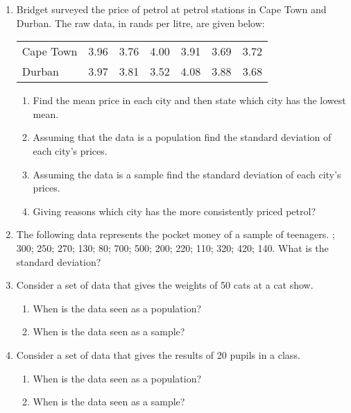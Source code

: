 {
\begin{enumerate}
\item Bridget surveyed the price of petrol at petrol stations in Cape Town and Durban. The raw data, in rands per litre, are given below:
\begin{center}
\begin{tabular}{lllllll}
Cape Town & 3.96 & 3.76 & 4.00 & 3.91 & 3.69 & 3.72 \\
Durban    & 3.97 & 3.81 & 3.52 & 4.08 & 3.88 & 3.68 \\ 
\end{tabular}
\end{center}
	\begin{enumerate}
	\item Find the mean price in each city and then state which city has the lowest mean.
	\item Assuming that the data is a population find the standard deviation of each city's prices.
	\item Assuming the data is a sample find the standard deviation of each city's prices.
	\item Giving reasons which city has the more consistently priced petrol?
	\end{enumerate}
\item The following data represents the pocket money of a sample of teenagers. ; 300; 250; 270; 130; 80; 700; 500; 200; 220; 110; 320; 420; 140. \newline
What is the standard deviation?
\item Consider a set of data that gives the weights of 50 cats at a cat show.
	\begin{enumerate}
	\item When is the data seen as a population?
	\item When is the data seen as a sample?
	\end{enumerate}
\item Consider a set of data that gives the results of 20 pupils in a class.
	\begin{enumerate}
	\item When is the data seen as a population?
	\item When is the data seen as a sample?
	\end{enumerate}  
\end{enumerate}
}

